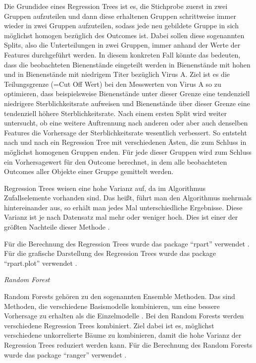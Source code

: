Die Grundidee eines Regression Trees ist es, die Stichprobe zuerst in zwei Gruppen aufzuteilen und dann diese erhaltenen Gruppen schrittweise immer wieder in zwei Gruppen aufzuteilen, sodass jede neu gebildete Gruppe in sich möglichst homogen bezüglich des Outcomes ist. Dabei sollen diese sogenannten Splits, also die Unterteilungen in zwei Gruppen, immer anhand der Werte der Features durchgeführt werden. In diesem konkreten Fall könnte das bedeuten, dass die beobachteten Bienenstände eingeteilt werden in Bienenstände mit hohen und in Bienenstände mit niedrigem Titer bezüglich Virus A. Ziel ist es die Teilungsgrenze (=Cut Off Wert) bei den Messwerten von Virus A so zu optimieren, dass beispielsweise Bienenstände unter dieser Grenze eine tendenziell niedrigere Sterblichkeitsrate aufweisen und Bienenstände über dieser Grenze eine tendenziell höhere Sterblichkeitsrate. Nach einem ersten Split wird weiter untersucht, ob eine weitere Auftrennung nach anderen oder aber auch denselben Features die Vorhersage der Sterblichkeitsrate wesentlich verbessert. So entsteht nach und nach ein Regression Tree mit verschiedenen Ästen, die zum Schluss in möglichst homogenen Gruppen enden. Für jede dieser Gruppen wird zum Schluss ein Vorhersagewert für den Outcome berechnet, in dem alle beobachteten Outcomes aller Objekte einer Gruppe gemittelt werden.

Regression Trees weisen eine hohe Varianz auf, da im Algorithmus Zufallselemente vorhanden sind. Das heißt, führt man den Algorithmus mehrmals hintereinander aus, so erhält man jedes Mal unterschiedliche Ergebnisse. Diese Varianz ist je nach Datensatz mal mehr oder weniger hoch. Dies ist einer der größten Nachteile dieser Methode \citep{breiman1984}.

Für die Berechnung des Regression Trees wurde das package \enquote{rpart}  verwendet \citep{rpart}. Für die grafische Darstellung des Regression Trees wurde das package \enquote{rpart.plot} verwendet \citep{rpart.plot}.


\textit{Random Forest}

Random Forests gehören zu den sogenannten Ensemble Methoden. Das sind Methoden, die verschiedene Basismodelle kombinieren, um eine bessere Vorhersage zu erhalten als die Einzelmodelle \citep{smolyakov2017}. Bei den Random Forests werden verschiedene Regression Trees kombiniert. Ziel dabei ist es, möglichst verschiedene unkorrelierte Bäume zu kombinieren, damit die hohe Varianz der Regression Trees reduziert werden kann. Für die Berechnung des Random Forests wurde das package \enquote{ranger} verwendet \citep{ranger}.

